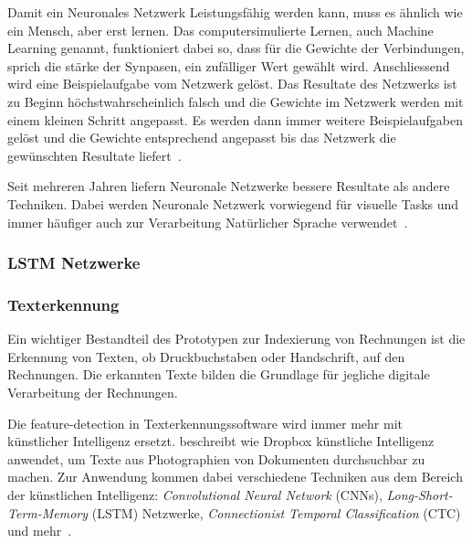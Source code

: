 \documentclass{hwz}
\begin{document}
Damit ein Neuronales Netzwerk Leistungsfähig werden kann, muss es ähnlich wie ein Mensch, aber erst lernen. Das computersimulierte Lernen, auch Machine Learning genannt, funktioniert dabei so, dass für die Gewichte der Verbindungen, sprich die stärke der Synpasen, ein zufälliger Wert gewählt wird. Anschliessend wird eine Beispielaufgabe vom Netzwerk gelöst. Das Resultate des Netzwerks ist zu Beginn höchstwahrscheinlich falsch und die Gewichte im Netzwerk werden mit einem kleinen Schritt angepasst. Es werden dann immer weitere Beispielaufgaben gelöst und die Gewichte entsprechend angepasst bis das Netzwerk die gewünschten Resultate liefert~\autocite{Krogh2008WhatNetworks}.

Seit mehreren Jahren liefern Neuronale Netzwerke bessere Resultate als andere Techniken. Dabei werden Neuronale Netzwerk vorwiegend für visuelle Tasks und immer häufiger auch zur Verarbeitung Natürlicher Sprache verwendet~\autocite{Olah2014DeepRepresentations}.



\subsubsection{LSTM Netzwerke}


\subsubsection{Texterkennung}

Ein wichtiger Bestandteil des Prototypen zur Indexierung von Rechnungen ist die Erkennung von Texten, ob Druckbuchstaben oder Handschrift, auf den Rechnungen. Die erkannten Texte bilden die Grundlage für jegliche digitale Verarbeitung der Rechnungen.

Die feature-detection in Texterkennungssoftware wird immer mehr mit künstlicher Intelligenz ersetzt. \textcite{Neuberg2017CreatingLearning} beschreibt wie Dropbox künstliche Intelligenz anwendet, um Texte aus Photographien von Dokumenten durchsuchbar zu machen. Zur Anwendung kommen dabei verschiedene Techniken aus dem Bereich der künstlichen Intelligenz: \textit{Convolutional Neural Network} (CNNs),  \textit{Long-Short-Term-Memory} (LSTM) Netzwerke, \textit{Connectionist Temporal Classification} (CTC) und mehr~\autocite{Neuberg2017CreatingLearning}.
\end{document}
